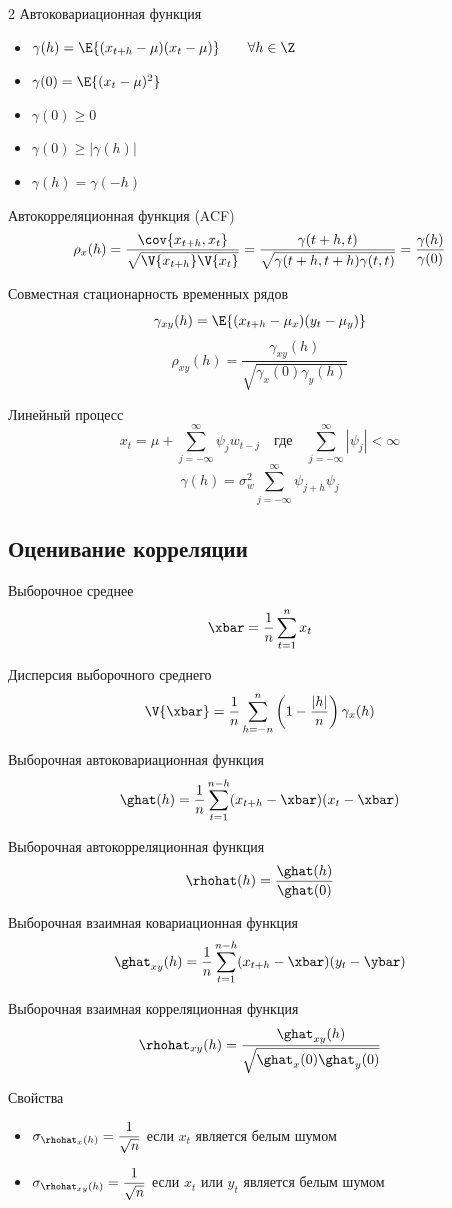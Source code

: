 \documentclass[landscape]{article}
\begin{document}
\begin{multicols*}{2}
Автоковариационная функция
\begin{itemize}
  \item $\gamma(h) = \E{(x_{t+h}-\mu)(x_t-\mu)} \qquad \forall h\in\Z$
  \item $\gamma(0) = \E{(x_t-\mu)^2}$
  \item $\gamma(0) \ge 0$
  \item $\gamma(0) \ge |\gamma(h)|$
  \item $\gamma(h) = \gamma(-h)$
\end{itemize}

Автокорреляционная функция (ACF)
\[\rho_x(h) = \frac{\cov{x_{t+h},x_t}}{\sqrt{\V{x_{t+h}}\V{x_t}}}
          = \frac{\gamma(t+h,t)}{\sqrt{\gamma(t+h,t+h)\gamma(t,t)}}
          = \frac{\gamma(h)}{\gamma(0)}\]

Совместная стационарность временных рядов
\[\gamma_{xy}(h) = \E{(x_{t+h}-\mu_x)(y_t-\mu_y)}\]
\[\rho_{xy}(h) = \frac{\gamma_{xy}(h)}{\sqrt{\gamma_x(0)\gamma_y(h)}}\]

Линейный процесс
\[x_t = \mu + \sum_{j=-\infty}^\infty \psi_j w_{t-j} \quad\text{где}\quad
\sum_{j=-\infty}^\infty |\psi_j| < \infty\]
\[\gamma(h) = \sigma_w^2 \sum_{j=-\infty}^\infty \psi_{j+h}\psi_j\]

\subsection{Оценивание корреляции}

Выборочное среднее
\[\xbar = \frac{1}{n}\sum_{t=1}^n x_t\]

Дисперсия выборочного среднего
\[\V{\xbar} = \frac{1}{n}\sum_{h=-n}^n \left(1-\frac{|h|}{n}\right)\gamma_x(h)\]

Выборочная автоковариационная функция
\[\ghat(h) = \frac{1}{n}\sum_{t=1}^{n-h}(x_{t+h}-\xbar)(x_t-\xbar)\]

Выборочная автокорреляционная функция
\[\rhohat(h) = \frac{\ghat(h)}{\ghat(0)}\]

Выборочная взаимная ковариационная функция
\[\ghat_{xy}(h) = \frac{1}{n} \sum_{t=1}^{n-h}(x_{t+h}-\xbar)(y_t - \ybar)\]

Выборочная взаимная корреляционная функция
\[\rhohat_{xy}(h) = \frac{\ghat_{xy}(h)}{\sqrt{\ghat_x(0) \ghat_y(0)}}\]

Свойства
\begin{itemize}
  \item $\sigma_{\rhohat_x(h)} = \displaystyle\frac{1}{\sqrt{n}}$
    если $x_t$ является белым шумом
  \item $\sigma_{\rhohat_{xy}(h)} = \displaystyle\frac{1}{\sqrt{n}}$
    если $x_t$ или $y_t$ является белым шумом
\end{itemize}


\end{multicols*}
\end{document}

